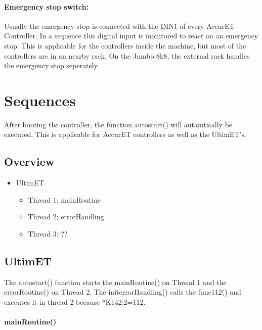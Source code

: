 \documentclass[a4paper, 12pt]{article}
\newcommand{\colBox}[1]{\colorbox{gray!20}{\textcolor{green!50!black}{#1}}}
\begin{document}
		\paragraph{Emergency stop switch:} Usually the emergency stop is connected with the DIN1 of every AccurET-Controller. In a sequence this digital input is monitored to react on an emergency stop. This is applicable for the controllers inside the machine, but most of the controllers are in an nearby rack. On the Jumbo 8k8, the external rack handles the emergency stop seperately. 
		
	\section{Sequences}
		After booting the controller, the function \colBox{autostart()} will autamtically be executed. This is applicable for AccurET controllers as well as the UltimET's. 
		\subsection{Overview}
			\begin{itemize}
				\item UltimET
				\begin{itemize}
					\item Thread 1: mainRoutine
					\item Thread 2: errorHandling
					\item Thread 3: ??
				\end{itemize}
			\end{itemize}
		\subsection{UltimET}
			The \colBox{autostart()} function starts the \colBox{mainRoutine()} on Thread 1 and the \colBox{errorRoutine()} on Thread 2.
			The initerrorHandling() calls the func112() and executes it in thread 2 because *K142:2=112.
			\paragraph{mainRoutine()}
				
%
%
%
\end{document}
